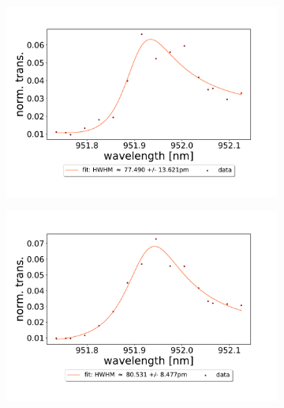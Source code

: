 \begin{figure}[h!] \ContinuedFloat
    \centering
    \begin{subfigure}[b]{0.49\textwidth}
        \includegraphics[width=\textwidth]{figures/results/double fano fits/20250326/251um_M3:M5_fit_7.pdf}
        \caption{}
        \label{fig:251um_M3:M5_fit_7}
    \end{subfigure}
    \begin{subfigure}[b]{0.49\textwidth}
        \includegraphics[width=\textwidth]{figures/results/double fano fits/20250326/251um_M3:M5_fit_8.pdf}
        \caption{}
        \label{fig:251um_M3:M5_fit_8}
    \end{subfigure}
    \begin{subfigure}[b]{0.49\textwidth}

\end{subfigure}
\end{figure}
